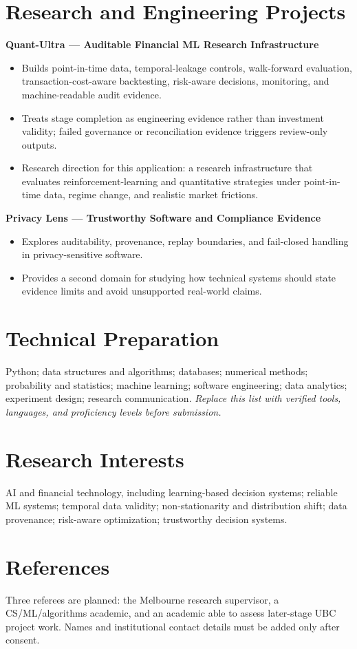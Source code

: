 \documentclass[11pt]{article}
\begin{document}
\section*{Research and Engineering Projects}
\textbf{Quant-Ultra --- Auditable Financial ML Research Infrastructure}
\begin{itemize}
\item Builds point-in-time data, temporal-leakage controls, walk-forward evaluation, transaction-cost-aware backtesting, risk-aware decisions, monitoring, and machine-readable audit evidence.
\item Treats stage completion as engineering evidence rather than investment validity; failed governance or reconciliation evidence triggers review-only outputs.
\item Research direction for this application: a research infrastructure that evaluates reinforcement-learning and quantitative strategies under point-in-time data, regime change, and realistic market frictions.
\end{itemize}

\textbf{Privacy Lens --- Trustworthy Software and Compliance Evidence}
\begin{itemize}
\item Explores auditability, provenance, replay boundaries, and fail-closed handling in privacy-sensitive software.
\item Provides a second domain for studying how technical systems should state evidence limits and avoid unsupported real-world claims.
\end{itemize}

\section*{Technical Preparation}
Python; data structures and algorithms; databases; numerical methods; probability and statistics; machine learning; software engineering; data analytics; experiment design; research communication. \textit{Replace this list with verified tools, languages, and proficiency levels before submission.}

\section*{Research Interests}
AI and financial technology, including learning-based decision systems; reliable ML systems; temporal data validity; non-stationarity and distribution shift; data provenance; risk-aware optimization; trustworthy decision systems.

\section*{References}
Three referees are planned: the Melbourne research supervisor, a CS/ML/algorithms academic, and an academic able to assess later-stage UBC project work. Names and institutional contact details must be added only after consent.
\end{document}
